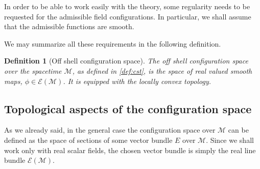 \documentclass[11pt]{book}
\newcommand{\Ecal}{\mathcal{E}}
\newcommand{\Mcal}{\mathcal{M}}
\theoremstyle{break}
\newtheorem{definition}{Definition}[chapter]
\begin{document}
In order to be able to work easily with the theory, some regularity needs to be requested for the admissible field configurations. In particular, we shall assume that the admissible functions are smooth.   


We may summarize all these requirements in the following definition.


\begin{definition}[Off shell configuration space]\label{def:config_space}
The off shell configuration space over the spacetime $\Mcal$, as defined in \ref{def:cst}, is the space of real valued smooth maps, $\phi \in \Ecal(\Mcal)$. It is equipped with the locally convex topology.
\end{definition}


\subsection{Topological aspects of the configuration space}
\label{p:TOPO_CONFIG_SPACE}


As we already said, in the general case the configuration space over $\Mcal$ can be defined as the space of sections of some vector bundle $E$ over $\Mcal$. Since we shall work only with real scalar fields, the chosen vector bundle is simply the real line bundle $\Ecal(\Mcal)$.
\end{document}
